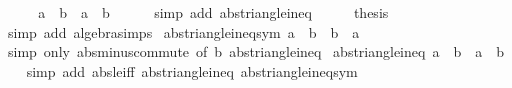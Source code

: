 \begin{isabellebody}
\ \ \isamarkupfalse%
\ \isamarkupfalse%
\ {\isachardoublequoteopen}{\isasymbar}a{\isasymbar}\ {\isasymle}\ {\isasymbar}b{\isasymbar}\ {\isacharplus}{\kern0pt}\ {\isasymbar}a\ {\isacharminus}{\kern0pt}\ b{\isasymbar}{\isachardoublequoteclose}\isanewline
\ \ \ \ \isamarkupfalse%
\ {\isacharparenleft}{\kern0pt}simp\ add{\isacharcolon}{\kern0pt}\ abs{\isacharunderscore}{\kern0pt}triangle{\isacharunderscore}{\kern0pt}ineq{\isacharparenright}{\kern0pt}\isanewline
\ \ \isamarkupfalse%
\ \isamarkupfalse%
\ {\isacharquery}{\kern0pt}thesis\isanewline
\ \ \ \ \isamarkupfalse%
\ {\isacharparenleft}{\kern0pt}simp\ add{\isacharcolon}{\kern0pt}\ algebra{\isacharunderscore}{\kern0pt}simps{\isacharparenright}{\kern0pt}\isanewline
{}\isamarkupfalse%
%
\endisatagproof
{\isafoldproof}%
%
\isadelimproof
\isanewline
%
\endisadelimproof
\isanewline
{}\isamarkupfalse%
\ abs{\isacharunderscore}{\kern0pt}triangle{\isacharunderscore}{\kern0pt}ineq{}{\isacharunderscore}{\kern0pt}sym{\isacharcolon}{\kern0pt}\ {\isachardoublequoteopen}{\isasymbar}a{\isasymbar}\ {\isacharminus}{\kern0pt}\ {\isasymbar}b{\isasymbar}\ {\isasymle}\ {\isasymbar}b\ {\isacharminus}{\kern0pt}\ a{\isasymbar}{\isachardoublequoteclose}\isanewline
%
\isadelimproof
\ \ %
\endisadelimproof
%
\isatagproof
{}\isamarkupfalse%
\ {\isacharparenleft}{\kern0pt}simp\ only{\isacharcolon}{\kern0pt}\ abs{\isacharunderscore}{\kern0pt}minus{\isacharunderscore}{\kern0pt}commute\ {\isacharbrackleft}{\kern0pt}of\ b{\isacharbrackright}{\kern0pt}\ abs{\isacharunderscore}{\kern0pt}triangle{\isacharunderscore}{\kern0pt}ineq{}{\isacharparenright}{\kern0pt}%
\endisatagproof
{\isafoldproof}%
%
\isadelimproof
\isanewline
%
\endisadelimproof
\isanewline
{}\isamarkupfalse%
\ abs{\isacharunderscore}{\kern0pt}triangle{\isacharunderscore}{\kern0pt}ineq{}{\isacharcolon}{\kern0pt}\ {\isachardoublequoteopen}{\isasymbar}{\isasymbar}a{\isasymbar}\ {\isacharminus}{\kern0pt}\ {\isasymbar}b{\isasymbar}{\isasymbar}\ {\isasymle}\ {\isasymbar}a\ {\isacharminus}{\kern0pt}\ b{\isasymbar}{\isachardoublequoteclose}\isanewline
%
\isadelimproof
\ \ %
\endisadelimproof
%
\isatagproof
{}\isamarkupfalse%
\ {\isacharparenleft}{\kern0pt}simp\ add{\isacharcolon}{\kern0pt}\ abs{\isacharunderscore}{\kern0pt}le{\isacharunderscore}{\kern0pt}iff\ abs{\isacharunderscore}{\kern0pt}triangle{\isacharunderscore}{\kern0pt}ineq{}\ abs{\isacharunderscore}{\kern0pt}triangle{\isacharunderscore}{\kern0pt}ineq{}{\isacharunderscore}{\kern0pt}sym{\isacharparenright}{\kern0pt}%

\end{isabellebody}
